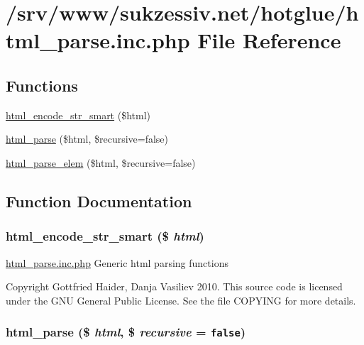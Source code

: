 \hypertarget{html__parse_8inc_8php}{
\section{/srv/www/sukzessiv.net/hotglue/html\_\-parse.inc.php File Reference}
\label{html__parse_8inc_8php}
}
\subsection*{Functions}
\begin{CompactItemize}
\item 
\hyperlink{html__parse_8inc_8php_7eda4037f4b2576b3bcd97408ff95bd5}{html\_\-encode\_\-str\_\-smart} (\$html)
\item 
\hyperlink{html__parse_8inc_8php_1003b146f08aef5a3a78d75a3538a4d7}{html\_\-parse} (\$html, \$recursive=false)
\item 
\hyperlink{html__parse_8inc_8php_6d9c21ee610953fb5b5b64fae3f74ed3}{html\_\-parse\_\-elem} (\$html, \$recursive=false)
\end{CompactItemize}


\subsection{Function Documentation}
\hypertarget{html__parse_8inc_8php_7eda4037f4b2576b3bcd97408ff95bd5}{
\subsubsection[{html\_\-encode\_\-str\_\-smart}]{\setlength{\rightskip}{0pt plus 5cm}html\_\-encode\_\-str\_\-smart (\$ {\em html})}}
\label{html__parse_8inc_8php_7eda4037f4b2576b3bcd97408ff95bd5}


\hyperlink{html__parse_8inc_8php}{html\_\-parse.inc.php} Generic html parsing functions

Copyright Gottfried Haider, Danja Vasiliev 2010. This source code is licensed under the GNU General Public License. See the file COPYING for more details. \hypertarget{html__parse_8inc_8php_1003b146f08aef5a3a78d75a3538a4d7}{
\subsubsection[{html\_\-parse}]{\setlength{\rightskip}{0pt plus 5cm}html\_\-parse (\$ {\em html}, \/  \$ {\em recursive} = {\tt false})}}
\label{html__parse_8inc_8php_1003b146f08aef5a3a78d75a3538a4d7}


